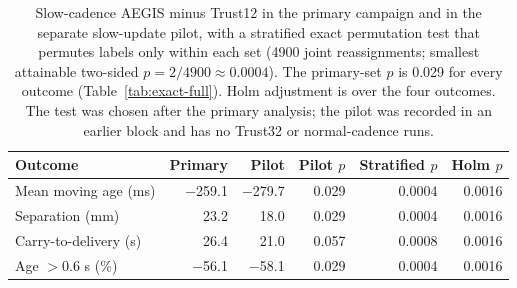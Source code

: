 \begin{table}[H]\centering\small
\caption{Slow-cadence AEGIS minus Trust12 in the primary campaign and in the separate slow-update pilot, with a stratified exact permutation test that permutes labels only within each set (4900 joint reassignments; smallest attainable two-sided $p=2/4900\approx0.0004$). The primary-set $p$ is 0.029 for every outcome (Table~\ref{tab:exact-full}). Holm adjustment is over the four outcomes. The test was chosen after the primary analysis; the pilot was recorded in an earlier block and has no Trust32 or normal-cadence runs.}\label{tab:stratified}
\begin{tabularx}{\linewidth}{>{\raggedright\arraybackslash}Xrrrrr}
\toprule Outcome & Primary & Pilot & Pilot $p$ & Stratified $p$ & Holm $p$\\ \midrule
Mean moving age (ms) & $-$259.1 & $-$279.7 & 0.029 & 0.0004 & 0.0016\\
Separation (mm) & 23.2 & 18.0 & 0.029 & 0.0004 & 0.0016\\
Carry-to-delivery (s) & 26.4 & 21.0 & 0.057 & 0.0008 & 0.0016\\
Age $>0.6$ s (\%) & $-$56.1 & $-$58.1 & 0.029 & 0.0004 & 0.0016\\
\bottomrule
\end{tabularx}
\end{table}
